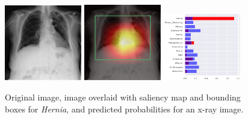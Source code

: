 \documentclass[12pt,oneside,a4paper]{report}
\begin{document}
\begin{figure}[H]
  \centering
  \includegraphics[width=0.3\textwidth]{images/preds/hernia}\hspace{0.01\textwidth}%
  \includegraphics[width=0.3\textwidth]{images/preds/hernia_cam}\hspace{0.01\textwidth}%
  \includegraphics[width=0.3\textwidth]{images/preds/hernia_probs}\\[0.01\textwidth]
  \caption{Original image, image overlaid with saliency map and bounding boxes
    for \emph{Hernia}, and predicted probabilities for an x-ray image.}
  \label{examples_14}
\end{figure}
\end{document}

